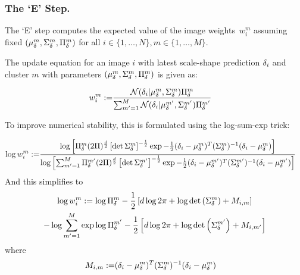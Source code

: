 \subsubsection{The `E' Step.}
The `E' step computes the expected value of the image weights~$w_{i}^{m}$ 
assuming fixed $(\mu_{\delta}^{m},\Sigma_{\delta}^{m},\Pi_{\delta}^{m})$ for all $i \in \{1,\dots,N\}, m \in \{1,\dots,M\}$.

The update equation for an image $i$ with latest scale-shape prediction $\delta_{i}$ and cluster $m$ with parameters $(\mu_{\delta}^{m},\Sigma_{\delta}^{m},\Pi_{\delta}^{m})$ 
is given as:

\begin{align}
    w_{i}^{m}
    :=& 
    \frac{
        \mathcal{N}(\delta_{i} | \mu_{\delta}^{m},\Sigma_{\delta}^{m})\Pi_{\delta}^{m}
    }
    {
        \sum_{m'=1}^{M}
        \mathcal{N}(\delta_{i} | \mu_{\delta}^{m'},\Sigma_{\delta}^{m'})\Pi_{\delta}^{m'}
    }
\end{align}

To improve numerical stability, this is formulated using the log-sum-exp trick:

\begin{align}
    \log{w_{i}^{m}}
    :=& 
    \frac{
        \log{
            \left[
            \Pi_{\delta}^{m} (2\Pi)^{\frac{d}{2}}
            \left[\det{\Sigma_{\delta}^{m}}\right]^{-\frac{1}{2}}
            \exp{
                -\frac{1}{2}
                (\delta_{i} - \mu_{\delta}^{m})^{T}
                (\Sigma_{\delta}^{m})^{-1}
                (\delta_{i} - \mu_{\delta}^{m})
            }
        \right]
        }
    }
    {
        \log{
            \left[
            \sum_{m'=1}^{M}
            \Pi_{\delta}^{m'} (2\Pi)^{\frac{d}{2}}
            \left[\det{\Sigma_{\delta}^{m'}}\right]^{-\frac{1}{2}}
            \exp{
                -\frac{1}{2}
                (\delta_{i} - \mu_{\delta}^{m'})^{T}
                (\Sigma_{\delta}^{m'})^{-1}
                (\delta_{i} - \mu_{\delta}^{m'})
            }
        \right]
        }
    }
\end{align}
And this simplifies to
\begin{multline}
    \log{w_{i}^{m}}
    :=
    \log{\Pi_{\delta}^{m}} - \frac{1}{2}
        \left[
            d\log{2\pi} + \log{\det{\left(\Sigma_{\delta}^{m}\right)}} + M_{i,m}
        \right] \\ -
    \log{
        \sum_{m'=1}^{M} 
        \exp{
            \log{\Pi_{\delta}^{m'}} - \frac{1}{2}
            \left[
                d\log{2\pi} + \log{\det{\left(\Sigma_{\delta}^{m'}\right)}} + M_{i,m'}
            \right]
        }
    }
\end{multline}
where
\begin{align}
M_{i,m} :=& 
    (\delta_{i} - \mu_{\delta}^{m})^{T}
    (\Sigma_{\delta}^{m})^{-1}
    (\delta_{i} - \mu_{\delta}^{m})    
\end{align}


